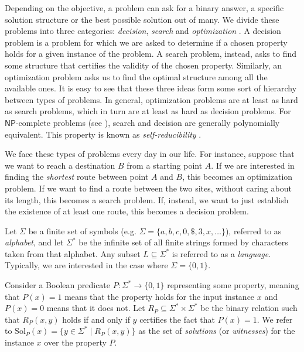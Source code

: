 Depending on the objective, a problem can ask for a binary answer, a specific solution structure or the best possible solution out of many. We divide these problems into three categories: \textit{decision}, \textit{search} and \textit{optimization} \cite{sip_book,papad_book}. A decision problem is a problem for which we are asked to determine if a chosen property holds for a given instance of the problem. A search problem, instead, asks to find some structure that certifies the validity of the chosen property. Similarly, an optimization problem asks us to find the optimal structure among all the available ones. It is easy to see that these three ideas form some sort of hierarchy between types of problems. In general, optimization problems are at least as hard as search problems, which in turn are at least as hard as decision problems. For $\mathsf{NP}$-complete problems (see ), search and decision are generally polynomially equivalent. This property is known as \textit{self-reducibility} \cite{decision_vs_search,papad_book}.

We face these types of problems every day in our life. For instance, suppose that we want to reach a destination $B$ from a starting point $A$. If we are interested in finding the \textit{shortest} route between point $A$ and $B$, this becomes an optimization problem. If we want to find a route between the two sites, without caring about its length, this becomes a search problem. If, instead, we want to just establish the existence of at least one route, this becomes a decision problem.  

Let $\Sigma$ be a finite set of symbols (e.g. $\Sigma = \{a,b,c, 0, \$, 3, x, \ldots\}$), referred to as \textit{alphabet}, and let $\Sigma^*$ be the infinite set of all finite strings formed by characters taken from that alphabet. Any subset $L \subseteq \Sigma^*$ is referred to as a \textit{language}. Typically, we are interested in the case where $\Sigma = \{0,1\}$.

Consider a Boolean predicate $P : \Sigma^* \to \{0,1\}$ representing some property, meaning that $P(x) = 1$ means that the property holds for the input instance $x$ and $P(x) = 0$ means that it does not. Let $R_P \subseteq \Sigma^* \times \Sigma^*$ be the binary relation such that $R_P(x,y)$ holds if and only if $y$ certifies the fact that $P(x) = 1$. We refer to $\mathrm{Sol}_P(x) = \{y \in \Sigma^* \mid R_P(x,y)\}$ as the set of \textit{solutions} (or \textit{witnesses}) for the instance $x$ over the property $P$.

